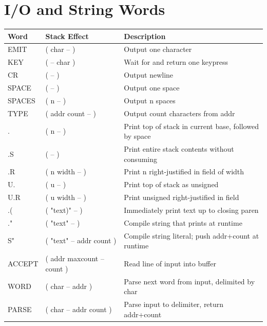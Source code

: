 \section*{I/O and String Words}
\begin{longtable}{>{\ttfamily}lp{4.5cm}p{7cm}}
\toprule
\normalfont Word & Stack Effect & Description \\
\midrule
\endhead
\bottomrule
\endfoot
EMIT    & ( char -- )         & Output one character \\
KEY     & ( -- char )         & Wait for and return one keypress \\
CR      & ( -- )              & Output newline \\
SPACE   & ( -- )              & Output one space \\
SPACES  & ( n -- )            & Output n spaces \\
TYPE    & ( addr count -- )   & Output count characters from addr \\
.       & ( n -- )            & Print top of stack in current base, followed by space \\
.S      & ( -- )              & Print entire stack contents without consuming \\
.R      & ( n width -- )      & Print n right-justified in field of width \\
U.      & ( u -- )            & Print top of stack as unsigned \\
U.R     & ( u width -- )      & Print unsigned right-justified in field \\
.(      & ( "text)" -- )      & Immediately print text up to closing paren \\
."      & ( "text" -- )       & Compile string that prints at runtime \\
S"      & ( "text" -- addr count ) & Compile string literal; push addr+count at runtime \\
ACCEPT  & ( addr maxcount -- count ) & Read line of input into buffer \\
WORD    & ( char -- addr )    & Parse next word from input, delimited by char \\
PARSE   & ( char -- addr count ) & Parse input to delimiter, return addr+count \\
\end{longtable}

